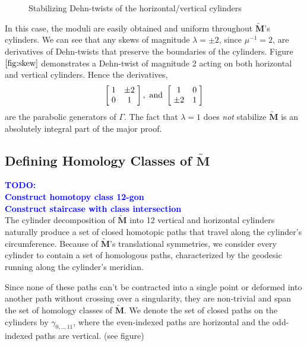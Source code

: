 \documentclass[]{article}
\newcommand{\compav}[1]{\textbf{\textcolor{blue}{#1}}}
\begin{document}
\begin{figure}[H]
\centering

\caption{Stabilizing Dehn-twists of the horizontal/vertical cylinders}
\label{fig:skew}
\end{figure}

In this case, the moduli are easily obtained and uniform throughout $\tilde{\mathbf{M}}$'s cylinders. We can see that any skews of magnitude $\lambda=\pm2$, since $\mu^{-1}{}=2$, are derivatives of Dehn-twists that preserve the boundaries of the cylinders. Figure $\ref{fig:skew}$ demonstrates a Dehn-twist of magnitude 2 acting on both horizontal and vertical cylinders. Hence the derivatives, 
\begin{equation}
\left[ \hspace{1mm} \begin{matrix}
				1 & \pm 2\\
				0 & 1
			\end{matrix}\hspace{1mm}\right],\text{ and }
			\left[ \hspace{1mm} \begin{matrix}
							1 & 0\\
							\pm 2 & 1
						\end{matrix}\hspace{1mm}\right]
\end{equation}
are the parabolic generators of $\Gamma$. The fact that $\lambda=1$ does \emph{not} stabilize $\tilde{\mathbf{M}}$ is an absolutely integral part of the major proof.

\newpage
\subsection{Defining Homology Classes of $\tilde{\mathbf{M}}$}
\compav{TODO:\\
Construct homotopy class 12-gon\\
Construct staircase with class intersection\\}
The cylinder decomposition of $\tilde{\mathbf{M}}$ into 12 vertical and horizontal cylinders naturally produce a set of closed homotopic paths that travel along the cylinder's circumference. Because of $\tilde{\mathbf{M}}$'s translational symmetries, we consider every cylinder to contain a set of homologous paths, characterized by the geodesic running along the cylinder's meridian. 

Since none of these paths can't be contracted into a single point or deformed into another path without crossing over a singularity, they are non-trivial and span the set of homology classes of $\tilde{\mathbf{M}}$. We denote the set of closed paths on the cylinders by $\gamma_{0,..,11}$, where the even-indexed paths are horizontal and the odd-indexed paths are vertical. (see figure)
\end{document}
